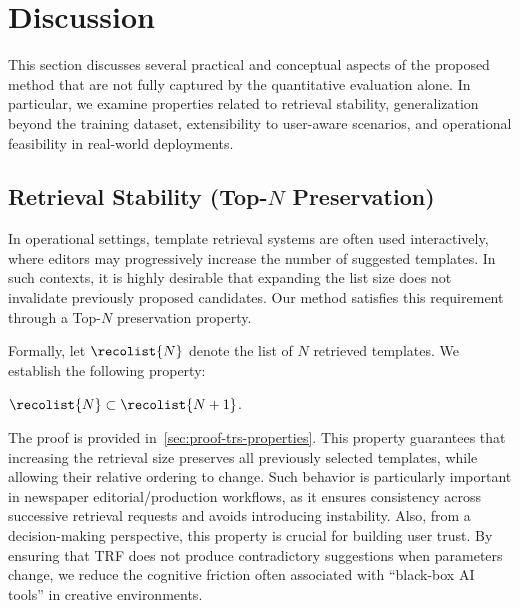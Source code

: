 \section{Discussion}
\label{sec:discussion}

This section discusses several practical and conceptual aspects of the proposed method that are not fully captured by the quantitative evaluation alone. In particular, we examine properties related to retrieval stability, generalization beyond the training dataset, extensibility to user-aware scenarios, and operational feasibility in real-world deployments.

\subsection{Retrieval Stability (Top-$N$ Preservation)} 
\label{sec:discussion:preservation}

In operational settings, template retrieval systems are often used interactively, where editors may progressively increase the number of suggested templates. In such contexts, it is highly desirable that expanding the list size does not invalidate previously proposed candidates. Our method satisfies this requirement through a Top-$N$ preservation property.

Formally, let $\recolist{N}$ denote the list of $N$ retrieved templates. We establish the following property:
\begin{proposition}
\label{proposition:trs}
$\recolist{N} \subset \recolist{N+1}$.
\end{proposition}

The proof is provided in~\ref{sec:proof-trs-properties}. This property guarantees that increasing the retrieval size preserves all previously selected templates, while allowing their relative ordering to change. Such behavior is particularly important in newspaper editorial/production workflows, as it ensures consistency across successive retrieval requests and avoids introducing instability. Also, from a decision-making perspective, this property is crucial for building user trust. By ensuring that TRF does not produce contradictory suggestions when parameters change, we reduce the cognitive friction often associated with ``black-box AI tools'' in creative environments.

